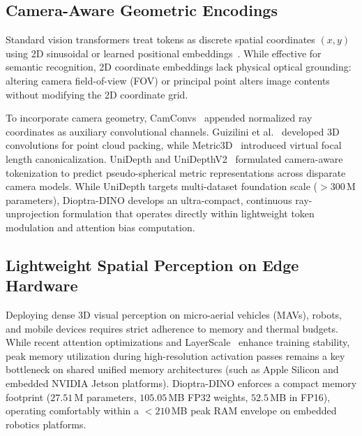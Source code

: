 \subsection{Camera-Aware Geometric Encodings}
Standard vision transformers treat tokens as discrete spatial coordinates $(x, y)$ using 2D sinusoidal or learned positional embeddings~\cite{vaswani2017attention,dosovitskiy2020image}. While effective for semantic recognition, 2D coordinate embeddings lack physical optical grounding: altering camera field-of-view (FOV) or principal point alters image contents without modifying the 2D coordinate grid.

To incorporate camera geometry, CamConvs~\cite{facil2019camconvs} appended normalized ray coordinates as auxiliary convolutional channels. Guizilini et al.~\cite{guizilini20203d} developed 3D convolutions for point cloud packing, while Metric3D~\cite{yin2023metric3d,yin2024metric3dv2} introduced virtual focal length canonicalization. UniDepth and UniDepthV2~\cite{piccinelli2024unidepth,piccinelli2025unidepth2} formulated camera-aware tokenization to predict pseudo-spherical metric representations across disparate camera models. While UniDepth targets multi-dataset foundation scale ($>300$\,M parameters), Dioptra-DINO develops an ultra-compact, continuous ray-unprojection formulation that operates directly within lightweight token modulation and attention bias computation.

\subsection{Lightweight Spatial Perception on Edge Hardware}
Deploying dense 3D visual perception on micro-aerial vehicles (MAVs), robots, and mobile devices requires strict adherence to memory and thermal budgets. While recent attention optimizations and LayerScale~\cite{touvron2021going} enhance training stability, peak memory utilization during high-resolution activation passes remains a key bottleneck on shared unified memory architectures (such as Apple Silicon and embedded NVIDIA Jetson platforms). Dioptra-DINO enforces a compact memory footprint ($27.51$\,M parameters, $105.05$\,MB FP32 weights, $52.5$\,MB in FP16), operating comfortably within a $<210$\,MB peak RAM envelope on embedded robotics platforms.
